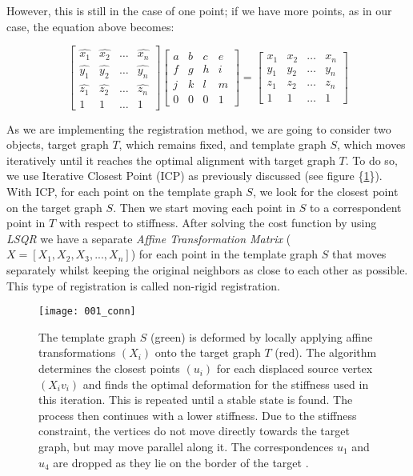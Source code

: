 \documentclass[../structure.tex]{subfiles}
\begin{document}
However,  this is still in the case of one point; if we have more points, as in our case, the equation above becomes:

\begin{equation*}
\begin{bmatrix}
\hat{x_{1}} & \hat{x_{2}} & \dots & \hat{x_{n}}\\
\hat{y_{1}} & \hat{y_{2}} & \dots & \hat{y_{n}}\\
\hat{z_{1}} & \hat{z_{2}} & \dots & \hat{z_{n}}\\
1 & 1 & \dots & 1
\end{bmatrix}
\begin{bmatrix}
a & b & c & e\\
f & g & h & i\\
j & k & l & m\\
0 & 0 & 0 & 1
\end{bmatrix}
=
\begin{bmatrix}
x_{1} & x_{2} & \dots & x_{n}\\
y_{1} & y_{2} & \dots & y_{n}\\
z_{1} & z_{2} & \dots & z_{n}\\
1 & 1 & \dots & 1
\end{bmatrix}
\end{equation*}

\pagebreak

\hspace{2em}As we are implementing the registration method, we are going to consider two objects, target graph $T$, which remains fixed, and template graph $S$, which moves iteratively until it reaches the optimal alignment with target graph $T$. To do so, we use Iterative Closest Point (ICP) as previously discussed (see figure \{\ref{fig:icp}\}). With ICP, for each point on the template graph $S$, we look for the closest point on the target graph $S$. Then we start moving each point in $S$ to a correspondent point in $T$ with respect to stiffness. After solving the cost function by using \textit{LSQR} we have a separate \textit{Affine Transformation Matrix} ($X = [X_{1}, X_{2}, X_{3}, ...,X_{n}]$) for each point in the template graph $S$ that moves separately whilst keeping the original neighbors as close to each other as possible. This type of registration is called non-rigid registration.

\begin{figure}[h!]
\centering
\texttt{[image: 001\_conn]}
\captionsetup{justification=centering}
\caption{The template graph $S$ (green) is deformed by locally applying affine transformations $(X_{i})$ onto the target graph $T$ (red). The algorithm determines the closest points $(u_{i})$ for each displaced source vertex $(X_{i}v_{i})$ and finds the optimal deformation for the stiffness used in this iteration. This is repeated until a stable state is found. The process then continues with a lower stiffness. Due to the stiffness constraint, the vertices do not move directly towards the target graph, but may move parallel along it. The correspondences $u_{1}$
and $u_{4}$ are dropped as they lie on the border of the target \cite{Amberg2007}.}
\label{fig:icp}
\end{figure}
\end{document}

